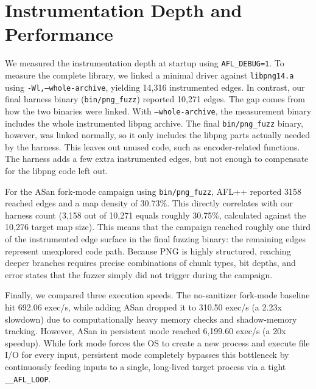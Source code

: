 \section{Instrumentation Depth and Performance}

We measured the instrumentation depth at startup using \texttt{AFL\_DEBUG=1}. To measure the complete library, we linked a minimal driver against \texttt{libpng14.a} using \texttt{-Wl,--whole-archive}, yielding 14,316 instrumented edges. In contrast, our final harness binary (\texttt{bin/png\_fuzz}) reported 10,271 edges. The gap comes from how the two binaries were linked. With
\texttt{--whole-archive}, the measurement binary includes the whole instrumented libpng archive. The final \texttt{bin/png\_fuzz} binary, however, was linked normally, so it only includes the libpng parts actually needed by the harness. This leaves out unused code, such as encoder-related functions. The harness adds a few extra instrumented edges, but not enough to compensate for the libpng code left out.

For the ASan fork-mode campaign using \texttt{bin/png\_fuzz}, AFL++ reported 3158 reached edges and a map density of 30.73\%. This directly correlates with our harness count (3,158 out of 10,271 equals roughly 30.75\%, calculated against the 10,276 target map size). This means that the campaign reached roughly one third of the instrumented edge surface in the final fuzzing binary: the remaining edges represent unexplored code path. Because PNG is highly structured, reaching deeper branches requires precise combinations of chunk types, bit depths, and error states that the fuzzer simply did not trigger during the campaign.

Finally, we compared three execution speeds. The no-sanitizer fork-mode baseline hit 692.06 exec/s, while adding ASan dropped it to 310.50 exec/s (a 2.23x slowdown) due to computationally heavy memory checks and shadow-memory tracking. However, ASan in persistent mode reached 6,199.60 exec/s (a 20x speedup).  While fork mode forces the OS to create a new process and execute file I/O for every input, persistent mode completely bypasses this bottleneck by continuously feeding inputs to a single, long-lived target process via a tight \texttt{\_\_AFL\_LOOP}.